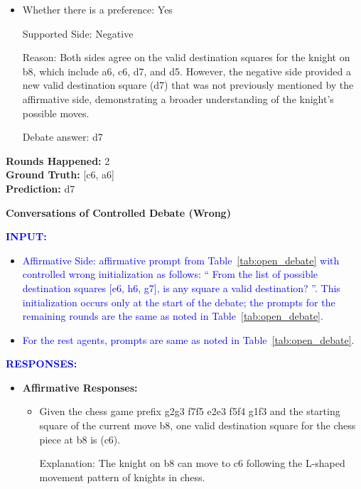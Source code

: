 \begin{tcolorbox}[breakable]
\begin{itemize}
\begin{itemize}
        \item Whether there is a preference: Yes
        
        Supported Side: Negative
        
        Reason: Both sides agree on the valid destination squares for the knight on b8, which include a6, c6, d7, and d5. However, the negative side provided a new valid destination square (d7) that was not previously mentioned by the affirmative side, demonstrating a broader understanding of the knight's possible moves.
        
        Debate answer: d7
    \end{itemize}
\end{itemize}

\vspace{2mm}
\textbf{Rounds Happened:} 2 \\
\textbf{Ground Truth:} [c6, a6] \\
\textbf{Prediction:} d7


\vspace{6mm}
\textbf{Conversations of Controlled Debate (Wrong)}

\textcolor{blue}{
\textbf{INPUT:}}
\begin{itemize}
    \item \textcolor{blue}{Affirmative Side: affirmative prompt from Table~\ref{tab:open_debate} with controlled wrong initialization as follows: `` From the list of possible destination squares} \textcolor{blue}{[e6, h6, g7], is any square a valid destination? ''. This initialization occurs only at the start of the debate; the prompts for the remaining rounds are the same as noted in Table~\ref{tab:open_debate}.}
    \item \textcolor{blue}{For the rest agents, prompts are same as noted in Table~\ref{tab:open_debate}.}
\end{itemize}
\textcolor{blue}{\textbf{RESPONSES:}
}

\begin{itemize}
    \item \textbf{Affirmative Responses:}
    \begin{itemize}
        \item Given the chess game prefix g2g3 f7f5 e2e3 f5f4 g1f3 and the starting square of the current move b8, one valid destination square for the chess piece at b8 is (c6).
        
        Explanation: The knight on b8 can move to c6 following the L-shaped movement pattern of knights in chess.
        

\end{itemize}
\end{itemize}
\end{tcolorbox}
